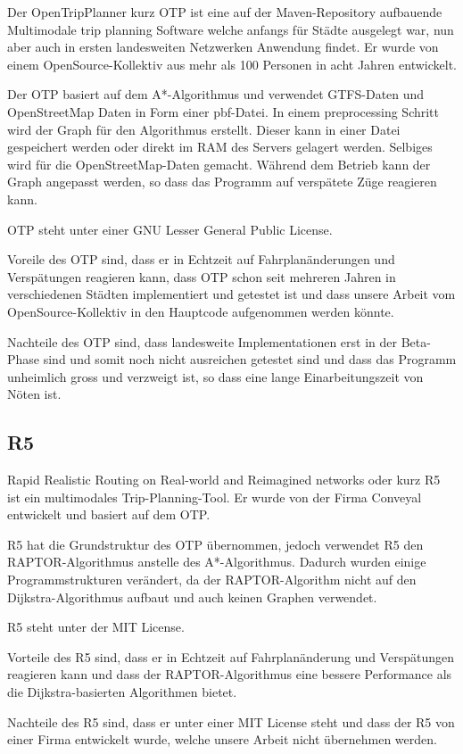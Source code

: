 Der OpenTripPlanner kurz OTP ist eine auf der Maven-Repository aufbauende Multimodale trip planning Software welche anfangs für Städte ausgelegt war, nun aber auch in ersten landesweiten Netzwerken Anwendung findet. Er wurde von einem OpenSource-Kollektiv aus mehr als 100 Personen in acht Jahren entwickelt. \vspace{0.5cm}

Der OTP basiert auf dem A*-Algorithmus und verwendet GTFS-Daten und OpenStreetMap Daten in Form einer pbf-Datei. In einem preprocessing Schritt wird der Graph für den Algorithmus erstellt. Dieser kann in einer Datei gespeichert werden oder direkt im RAM des Servers gelagert werden. Selbiges wird für die OpenStreetMap-Daten gemacht. Während dem Betrieb kann der Graph angepasst werden, so dass das Programm auf verspätete Züge reagieren kann. \vspace{0.5cm}

OTP steht unter einer GNU Lesser General Public License. \vspace{0.5cm}

Voreile des OTP sind, dass er in Echtzeit auf Fahrplanänderungen und Verspätungen reagieren kann, dass OTP schon seit mehreren Jahren in verschiedenen Städten implementiert und getestet ist und dass unsere Arbeit vom OpenSource-Kollektiv in den Hauptcode aufgenommen werden könnte. \vspace{0.5cm}

Nachteile des OTP sind, dass landesweite Implementationen erst in der Beta-Phase sind und somit noch nicht ausreichen getestet sind und dass das Programm unheimlich gross und verzweigt ist, so dass eine lange Einarbeitungszeit von Nöten ist.



\subsection{R5}
\label{subsec:R5}

Rapid Realistic Routing on Real-world and Reimagined networks oder kurz R5 ist ein multimodales Trip-Planning-Tool. Er wurde von der Firma Conveyal entwickelt und basiert auf dem OTP. \vspace{0.5cm}

R5 hat die Grundstruktur des OTP übernommen, jedoch verwendet R5 den RAPTOR-Algorithmus anstelle des A*-Algorithmus. Dadurch wurden einige Programmstrukturen verändert, da der RAPTOR-Algorithm nicht auf den Dijkstra-Algorithmus aufbaut und auch keinen Graphen verwendet. \vspace{0.5cm}

R5 steht unter der MIT License. \vspace{0.5cm}

Vorteile des R5 sind, dass er in Echtzeit auf Fahrplanänderung und Verspätungen reagieren kann und dass der RAPTOR-Algorithmus eine bessere Performance als die Dijkstra-basierten Algorithmen bietet. \vspace{0.5cm}

Nachteile des R5 sind, dass er unter einer MIT License steht und dass der R5 von einer Firma entwickelt wurde, welche unsere Arbeit nicht übernehmen werden.


